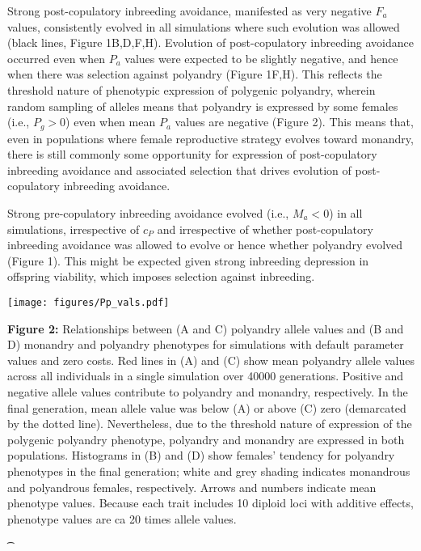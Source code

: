 \documentclass[10pt,letterpaper]{article}
\begin{document}
Strong post-copulatory inbreeding avoidance, manifested as very negative $F_{a}$ values, consistently evolved in all simulations where such evolution was allowed (black lines, Figure 1B,D,F,H). Evolution of post-copulatory inbreeding avoidance occurred even when $P_{a}$ values were expected to be slightly negative, and hence when there was selection against polyandry (Figure 1F,H). This reflects the threshold nature of phenotypic expression of polygenic polyandry, wherein random sampling of alleles means that polyandry is expressed by some females (i.e., $P_{g}>0$) even when mean $P_{a}$ values are negative (Figure 2). This means that, even in populations where female reproductive strategy evolves toward monandry, there is still commonly some opportunity for expression of post-copulatory inbreeding avoidance and associated selection that drives evolution of post-copulatory inbreeding avoidance.

Strong pre-copulatory inbreeding avoidance evolved (i.e., $M_{a}<0$) in all simulations, irrespective of $c_{P}$ and irrespective of whether post-copulatory inbreeding avoidance was allowed to evolve or hence whether polyandry evolved (Figure 1). This might be expected given strong inbreeding depression in offspring viability, which imposes selection against inbreeding.

{\color{Gray}
\begin{adjustwidth}{-2.2in}{0in}
{
   \texttt{[image: figures/Pp\_vals.pdf]}%
}
{%
   \begin{justify}\vspace{0.75 mm} \textbf{Figure 2:} Relationships between (A and C) polyandry allele values and (B and D) monandry and polyandry phenotypes for simulations with default parameter values and zero costs. Red lines in (A) and (C) show mean polyandry allele values across all individuals in a single simulation over 40000 generations. Positive and negative allele values contribute to polyandry and monandry, respectively. In the final generation, mean allele value was below (A) or above (C) zero (demarcated by the dotted line). Nevertheless, due to the threshold nature of expression of the polygenic polyandry phenotype, polyandry and monandry are expressed in both populations. Histograms in (B) and (D) show females' tendency for polyandry phenotypes in the final generation; white and grey shading indicates monandrous and polyandrous females, respectively. Arrows and numbers indicate mean phenotype values. Because each trait includes 10 diploid loci with additive effects, phenotype values are ca 20 times allele values.  \end{justify}{\t}%
}
\end{adjustwidth}
}
\end{document}
